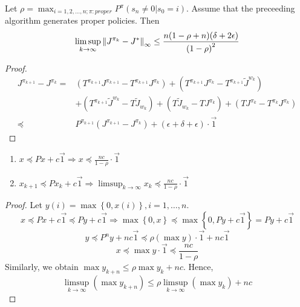 \begin{theorem}
    Let $ \rho = \max_{i = 1, 2, \ldots, n; \pi: proper} P^{\pi}(s_n \ne 0 | s_0 = i) $. Assume that the preceeding algorithm generates proper policies. Then
    \[
        \limsup_{k \rightarrow \infty} {\Arrowvert J^{\pi_k} - J^* \Arrowvert}_\infty \le \frac{n(1 - \rho + n)(\delta + 2\epsilon)}{{(1 - \rho)}^2} 
    \]
    \begin{proof}
        \begin{align*}
            J^{\pi_{k+1}} - J^{\pi_{k}} =&
            (T^{\pi_{k+1}} J^{\pi_{k+1}} - T^{\pi_{k+1}}J^{\pi_k})
            + (T^{\pi_{k+1}} J^{\pi_k}- T^{\pi_{k+1}}\tilde J^{w_{k}})\\
            &+ (T^{\pi_{k+1}} \tilde J^{w_{k}} - T \tilde J_{w_k})
            + (T \tilde J_{w_k} - TJ^{\pi_k}) + (TJ^{\pi_k} - T^{\pi_k} J^{\pi_k})\\
            \preceq& P^{\pi_{k+1}} (J^{\pi_{k+1}} - J^{\pi_k}) + (\epsilon + \delta + \epsilon) \cdot \vec{1}
        \end{align*}
    \end{proof}
    \begin{lemma}
        \begin{enumerate}
            \item $ x \preceq Px + c\vec{1} \Rightarrow x \preceq \frac{nc}{1 - \rho} \cdot \vec{1} $ 
            \item $ x_{k+1} \preceq P x_{k} + c \vec{1} \Rightarrow \limsup_{k \rightarrow \infty} x_k \preceq \frac{nc}{1 - \rho} \cdot \vec{1} $ 
        \end{enumerate}
        \begin{proof}
            Let $ y(i) = \max\left\{ 0, x(i) \right\}, i = 1, \ldots, n $.
            \[
                x \preceq Px + c\vec{1} \preceq Py + c \vec{1}
                \Rightarrow \max\left\{ 0, x \right\} \preceq \max\left\{ 0, Py + c\vec{1} \right\} = Py + c \vec{1}
            \]
            \[
                y \preceq P^n y + nc\vec{1} \preceq \rho \left( \max y \right) \cdot \vec{1} + nc \vec{1}
            \]
            \[
                x \preceq \max y \cdot \vec{1} \preceq \frac{nc}{1 - \rho} 
            \]
            Similarly, we obtain $ \max y_{k+n} \le \rho \max y_k + nc $. Hence,
            \[
                \limsup_{k \rightarrow \infty} \left( \max y_{k+n} \right) \le \rho \limsup_{k \rightarrow \infty} \left( \max y_k \right) + nc
            \]
        \end{proof}
    \end{lemma}

\end{theorem}
